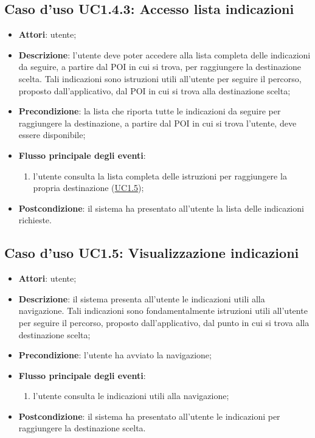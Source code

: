 \documentclass[../AnalisiDeiRequisiti.tex]{subfiles}
\begin{document}
\subsection{Caso d'uso UC1.4.3: Accesso lista indicazioni}
\begin{itemize}
\item \textbf{Attori}: utente;
\item \textbf{Descrizione}: l'utente deve poter accedere alla lista completa delle indicazioni da seguire, a partire dal POI in cui si trova, per raggiungere la destinazione scelta. Tali indicazioni sono istruzioni utili all'utente per seguire il percorso, proposto dall'applicativo, dal POI in cui si trova alla destinazione scelta; 
      \item \textbf{Precondizione}: la lista che riporta tutte le indicazioni da seguire per raggiungere la destinazione, a partire dal POI in cui si trova l'utente, deve essere disponibile;

        \item \textbf{Flusso principale degli eventi}:
          \begin{enumerate}
          \item l'utente consulta la lista completa delle istruzioni per raggiungere la propria destinazione (\hyperlink{UC1.5}{UC1.5});

      \end{enumerate}
    \item \textbf{Postcondizione}: il sistema ha presentato all'utente la lista delle indicazioni richieste.
  \end{itemize}
\hypertarget{UC1.5}{}
\subsection{Caso d'uso UC1.5: Visualizzazione indicazioni}

\begin{itemize}
\item \textbf{Attori}: utente;
\item \textbf{Descrizione}: il sistema presenta all'utente le indicazioni utili alla navigazione. Tali indicazioni sono fondamentalmente istruzioni utili all'utente per seguire il percorso, proposto dall'applicativo, dal punto in cui si trova alla destinazione scelta; 
      \item \textbf{Precondizione}: l'utente ha avviato la navigazione;

        \item \textbf{Flusso principale degli eventi}:
          \begin{enumerate}
          \item l'utente consulta le indicazioni utili alla navigazione;

      \end{enumerate}

    \item \textbf{Postcondizione}: il sistema ha presentato all'utente le indicazioni per raggiungere la destinazione scelta.
  \end{itemize}
\hypertarget{UC1.6}{}
\end{document}

